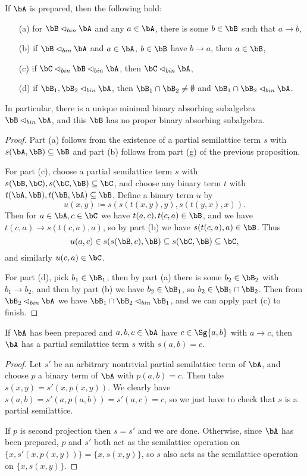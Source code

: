 \begin{prop}\label{prepared-bin-abs} If $\bA$ is prepared, then the following hold:
\begin{itemize}
\item[(a)] for $\bB \lhd_{bin} \bA$ and any $a \in \bA$, there is some $b \in \bB$ such that $a \rightarrow b$,
\item[(b)] if $\bB \lhd_{bin} \bA$ and $a \in \bA$, $b \in \bB$ have $b \rightarrow a$, then $a \in \bB$,
\item[(c)] if $\bC \lhd_{bin} \bB \lhd_{bin} \bA$, then $\bC \lhd_{bin} \bA$,
\item[(d)] if $\bB_1, \bB_2 \lhd_{bin} \bA$, then $\bB_1 \cap \bB_2 \ne \emptyset$ and $\bB_1 \cap \bB_2 \lhd_{bin} \bA$.
\end{itemize}
In particular, there is a unique minimal binary absorbing subalgebra $\bB \lhd_{bin} \bA$, and this $\bB$ has no proper binary absorbing subalgebra.
\end{prop}
\begin{proof} Part (a) follows from the existence of a partial semilattice term $s$ with $s(\bA,\bB) \subseteq \bB$ and part (b) follows from part (g) of the previous proposition.

For part (c), choose a partial semilattice term $s$ with $s(\bB,\bC), s(\bC,\bB) \subseteq \bC$, and choose any binary term $t$ with $t(\bA,\bB), t(\bB,\bA) \subseteq \bB$. Define a binary term $u$ by
\[
u(x,y) \coloneqq s(s(t(x,y),y),s(t(y,x),x)).
\]
Then for $a \in \bA, c \in \bC$ we have $t(a,c), t(c,a) \in \bB$, and we have $t(c,a) \rightarrow s(t(c,a),a)$, so by part (b) we have $s(t(c,a),a) \in \bB$. Thus
\[
u(a,c) \in s(s(\bB,c),\bB) \subseteq s(\bC,\bB) \subseteq \bC,
\]
and similarly $u(c,a) \in \bC$.

For part (d), pick $b_1 \in \bB_1$, then by part (a) there is some $b_2 \in \bB_2$ with $b_1 \rightarrow b_2$, and then by part (b) we have $b_2 \in \bB_1$, so $b_2 \in \bB_1 \cap \bB_2$. Then from $\bB_2 \lhd_{bin} \bA$ we have $\bB_1 \cap \bB_2 \lhd_{bin} \bB_1$, and we can apply part (c) to finish.
\end{proof}

\begin{prop}\label{arrow-partial} If $\bA$ has been prepared and $a,b,c \in \bA$ have $c \in \Sg\{a,b\}$ with $a \rightarrow c$, then $\bA$ has a partial semilattice term $s$ with $s(a,b) = c$.
\end{prop}
\begin{proof} Let $s'$ be an arbitrary nontrivial partial semilattice term of $\bA$, and choose $p$ a binary term of $\bA$ with $p(a,b) = c$. Then take $s(x,y) = s'(x,p(x,y))$. We clearly have $s(a,b) = s'(a,p(a,b)) = s'(a,c) = c$, so we just have to check that $s$ is a partial semilattice.

If $p$ is second projection then $s = s'$ and we are done. Otherwise, since $\bA$ has been prepared, $p$ and $s'$ both act as the semilattice operation on $\{x,s'(x,p(x,y))\} = \{x,s(x,y)\}$, so $s$ also acts as the semilattice operation on $\{x,s(x,y)\}$.
\end{proof}

